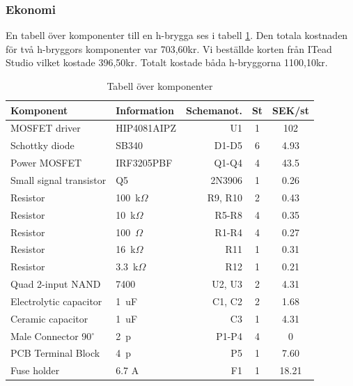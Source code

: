 \subsubsection{Ekonomi}
En tabell över komponenter till en h-brygga ses i tabell \ref{tbl:BOM}. Den totala kostnaden för två h-bryggors komponenter var 703,60kr. Vi beställde korten från ITead Studio vilket kostade 396,50kr. Totalt kostade båda h-bryggorna 1100,10kr.

\begin{table}[htb]
\centering
\caption{Tabell över komponenter}
\label{tbl:BOM}
\begin{tabular}{|l|l|r|c|c|}
\hline
\textbf{Komponent} & \textbf{Information} &
\textbf{Schemanot.} & \textbf{St} & \textbf{SEK/st} \\
\hline
MOSFET driver & HIP4081AIPZ & U1 & 1 & 102 \\
\hline
Schottky diode & SB340 & D1-D5 & 6 & 4.93\\
\hline
Power MOSFET & IRF3205PBF & Q1-Q4 & 4 & 43.5\\
\hline
Small signal transistor & Q5 & 2N3906 & 1 & 0.26\\
\hline
Resistor & 100~k$\Omega$ & R9, R10 & 2 & 0.43\\
\hline
Resistor & 10~k$\Omega$ & R5-R8 & 4 & 0.35\\
\hline
Resistor & 100~$\Omega$ & R1-R4 & 4 & 0.27\\
\hline
Resistor & 16~k$\Omega$ & R11 & 1 & 0.31\\
\hline
Resistor & 3.3~k$\Omega$ & R12 & 1 & 0.21\\
\hline
Quad 2-input NAND & 7400 & U2, U3 & 2 & 4.31\\
\hline
Electrolytic capacitor & 1~uF & C1, C2 & 2 & 1.68\\
\hline
Ceramic capacitor & 1~uF & C3 & 1 & 4.31\\
\hline
Male Connector 90$^{\circ}$ & 2~p & P1-P4 & 4 & 0\\
\hline
PCB Terminal Block &  4~p & P5 & 1 & 7.60\\
\hline
Fuse holder & 6.7 A & F1 & 1 & 18.21\\
\hline
\end{tabular}	
\end{table}